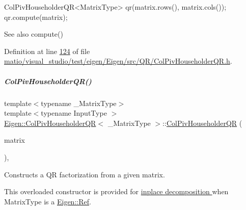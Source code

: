 \begin{DoxyCode}
ColPivHouseholderQR<MatrixType> qr(matrix.rows(), matrix.cols());
qr.compute(matrix);
\end{DoxyCode}


\begin{DoxySeeAlso}{See also}
compute() 
\end{DoxySeeAlso}


Definition at line \hyperlink{matio_2visual__studio_2test_2eigen_2_eigen_2src_2_q_r_2_col_piv_householder_q_r_8h_source_l00124}{124} of file \hyperlink{matio_2visual__studio_2test_2eigen_2_eigen_2src_2_q_r_2_col_piv_householder_q_r_8h_source}{matio/visual\+\_\+studio/test/eigen/\+Eigen/src/\+Q\+R/\+Col\+Piv\+Householder\+Q\+R.\+h}.

\mbox{\label{group___q_r___module_a65782010a93a4c9ef4a9191ac8fe30bc}} 
\subparagraph{\texorpdfstring{Col\+Piv\+Householder\+Q\+R()}{ColPivHouseholderQR()}\hspace{0.1cm}{\footnotesize\ttfamily [8/8]}}
{\footnotesize\ttfamily template$<$typename \+\_\+\+Matrix\+Type$>$ \\
template$<$typename Input\+Type $>$ \\
\hyperlink{group___q_r___module_class_eigen_1_1_col_piv_householder_q_r}{Eigen\+::\+Col\+Piv\+Householder\+QR}$<$ \+\_\+\+Matrix\+Type $>$\+::\hyperlink{group___q_r___module_class_eigen_1_1_col_piv_householder_q_r}{Col\+Piv\+Householder\+QR} (\begin{DoxyParamCaption}\item[{\hyperlink{group___core___module_struct_eigen_1_1_eigen_base}{Eigen\+Base}$<$ Input\+Type $>$ \&}]{matrix }\end{DoxyParamCaption})\hspace{0.3cm}{\ttfamily [inline]}, {\ttfamily [explicit]}}



Constructs a QR factorization from a given matrix. 

This overloaded constructor is provided for \hyperlink{group___inplace_decomposition}{inplace decomposition } when {\ttfamily Matrix\+Type} is a \hyperlink{group___core___module_class_eigen_1_1_ref}{Eigen\+::\+Ref}.

